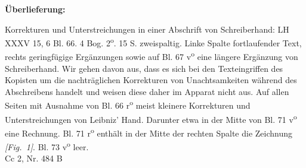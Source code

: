       
               
                \begin{ledgroupsized}[r]{120mm}
                \footnotesize 
                \pstart                
                \noindent\textbf{\"{U}berlieferung:}   
                \pend
                \end{ledgroupsized}
            
              
                            \begin{ledgroupsized}[r]{114mm}
                            \footnotesize 
                            \pstart \parindent -6mm
                            Korrekturen und Unterstreichungen in einer Abschrift von Schreiberhand: LH XXXV 15, 6 Bl. 66. 4 Bog. 2\textsuperscript{o}. 15 S. zweispaltig. Linke Spalte fortlaufender Text, rechts geringf\"{u}gige Erg\"{a}nzungen sowie auf Bl. 67 v\textsuperscript{o} eine l\"{a}ngere Erg\"{a}nzung von Schreiberhand. Wir gehen davon aus, dass es sich bei den Texteingriffen des Kopisten um die nachtr\"{a}glichen Korrekturen von Unachtsamkeiten w\"{a}hrend des Abschreibens handelt und weisen diese daher im Apparat nicht aus. Auf allen Seiten mit Ausnahme von Bl. 66 r\textsuperscript{o} meist kleinere Korrekturen und Unterstreichungen von Leibniz' Hand. Darunter etwa in der Mitte von Bl. 71 v\textsuperscript{o} eine Rech\-nung. Bl. 71 r\textsuperscript{o} enth\"{a}lt in der Mitte der rechten Spalte die Zeichnung \textit{[Fig.~1]}. Bl. 73 v\textsuperscript{o} leer.\\Cc 2, Nr. 484 B \pend
                            \end{ledgroupsized}
                \vspace*{8mm}
                \pstart 
                \normalsize

